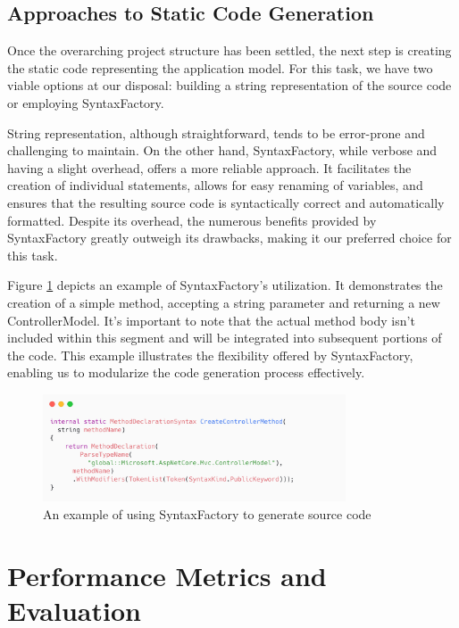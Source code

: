 \subsection{Approaches to Static Code Generation}

Once the overarching project structure has been settled, the next step is creating the static code representing the application model. For this task, we have two viable options at our disposal: building a string representation of the source code or employing SyntaxFactory.

String representation, although straightforward, tends to be error-prone and challenging to maintain. On the other hand, SyntaxFactory, while verbose and having a slight overhead, offers a more reliable approach. It facilitates the creation of individual statements, allows for easy renaming of variables, and ensures that the resulting source code is syntactically correct and automatically formatted. Despite its overhead, the numerous benefits provided by SyntaxFactory greatly outweigh its drawbacks, making it our preferred choice for this task. 

Figure \ref{fig:syntax-factory} depicts an example of SyntaxFactory's utilization. It demonstrates the creation of a simple method, accepting a string parameter and returning a new ControllerModel. It's important to note that the actual method body isn't included within this segment and will be integrated into subsequent portions of the code. This example illustrates the flexibility offered by SyntaxFactory, enabling us to modularize the code generation process effectively.

\begin{figure}[H]
\centering
\includegraphics[width=0.8\textwidth]{graphics/syntax-factory.png}
\caption{An example of using SyntaxFactory to generate source code}
\label{fig:syntax-factory}
\end{figure}

\section{Performance Metrics and Evaluation}

